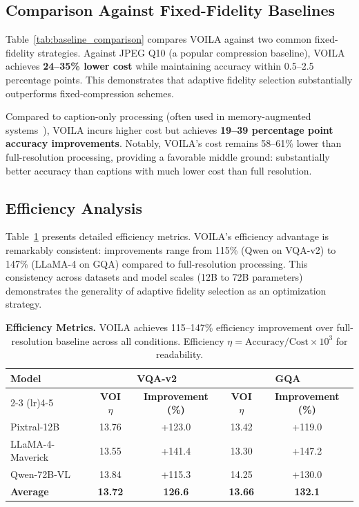 \subsection{Comparison Against Fixed-Fidelity Baselines}
\label{sec:baseline_comparison}


Table~\ref{tab:baseline_comparison} compares VOILA against two common fixed-fidelity strategies. Against JPEG Q10 (a popular compression baseline), VOILA achieves \textbf{24--35\% lower cost} while maintaining accuracy within 0.5--2.5 percentage points. This demonstrates that adaptive fidelity selection substantially outperforms fixed-compression schemes.

Compared to caption-only processing (often used in memory-augmented systems~\citep{mem0,mirix}), VOILA incurs higher cost but achieves \textbf{19--39 percentage point accuracy improvements}. Notably, VOILA's cost remains 58--61\% lower than full-resolution processing, providing a favorable middle ground: substantially better accuracy than captions with much lower cost than full resolution.

\subsection{Efficiency Analysis}
\label{sec:efficiency}



Table~\ref{tab:efficiency_metrics} presents detailed efficiency metrics. VOILA's efficiency advantage is remarkably consistent: improvements range from 115\% (Qwen on VQA-v2) to 147\% (LLaMA-4 on GQA) compared to full-resolution processing. This consistency across datasets and model scales (12B to 72B parameters) demonstrates the generality of adaptive fidelity selection as an optimization strategy.

\begin{table}[t]
\centering
\caption{\textbf{Efficiency Metrics.} VOILA achieves 115--147\% efficiency improvement over full-resolution baseline across all conditions. Efficiency $\eta = \text{Accuracy}/\text{Cost} \times 10^3$ for readability.}
\label{tab:efficiency_metrics}
\begin{tabular}{lcccc}
\toprule
\multirow{2}{*}{\textbf{Model}} & \multicolumn{2}{c}{\textbf{VQA-v2}} & \multicolumn{2}{c}{\textbf{GQA}} \\
\cmidrule(lr){2-3} \cmidrule(lr){4-5}
& \textbf{VOI $\eta$} & \textbf{Improvement (\%)} & \textbf{VOI $\eta$} & \textbf{Improvement (\%)} \\
\midrule
Pixtral-12B & 13.76 & +123.0 & 13.42 & +119.0 \\
LLaMA-4-Maverick & 13.55 & +141.4 & 13.30 & +147.2 \\
Qwen-72B-VL & 13.84 & +115.3 & 14.25 & +130.0 \\
\midrule
\textbf{Average} & \textbf{13.72} & \textbf{126.6} & \textbf{13.66} & \textbf{132.1} \\
\bottomrule
\end{tabular}
\end{table}

